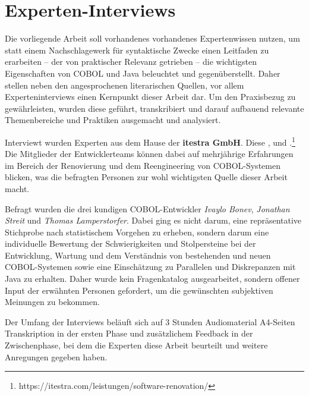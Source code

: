 \section{Experten-Interviews}\label{interviews}
Die vorliegende Arbeit soll vorhandenes vorhandenes Expertenwissen nutzen, um statt einem Nachschlagewerk für syntaktische Zwecke einen Leitfaden zu erarbeiten -- der von praktischer Relevanz getrieben -- die wichtigsten Eigenschaften von COBOL und Java beleuchtet und gegenüberstellt. Daher stellen neben den angesprochenen literarischen Quellen, vor allem Experteninterviews einen Kernpunkt dieser Arbeit dar. Um den Praxisbezug zu gewährleisten, wurden diese geführt, transkribiert und darauf aufbauend relevante Themenbereiche und Praktiken ausgemacht und analysiert.

Interviewt wurden Experten aus dem Hause der \textbf{itestra GmbH}. Diese ,  und .\footnote{\label{itestraFootnote}https://itestra.com/leistungen/software-renovation/} Die Mitglieder der Entwicklerteams können dabei auf mehrjährige Erfahrungen im Bereich der Renovierung und dem Reengineering von COBOL-Systemen blicken, was die befragten Personen zur wohl wichtigsten Quelle dieser Arbeit macht.

Befragt wurden die drei kundigen COBOL-Entwickler \textit{Ivaylo Bonev}, \textit{Jonathan Streit} und \textit{Thomas Lamperstorfer}. Dabei ging es nicht darum, eine repräsentative Stichprobe nach statistischem Vorgehen zu erheben, sondern darum eine individuelle Bewertung der Schwierigkeiten und Stolpersteine bei der Entwicklung, Wartung und dem Verständnis von bestehenden und neuen COBOL-Systemen sowie eine Einschätzung zu Parallelen und Diskrepanzen mit Java zu erhalten. Daher wurde kein Fragenkatalog ausgearbeitet, sondern offener Input der erwähnten Personen gefordert, um die gewünschten subjektiven Meinungen zu bekommen. 

Der Umfang der Interviews beläuft sich auf 3 Stunden Audiomaterial  A4-Seiten Transkription in der ersten Phase und zusätzlichem Feedback in der Zwischenphase, bei dem die Experten diese Arbeit beurteilt und weitere Anregungen gegeben haben.